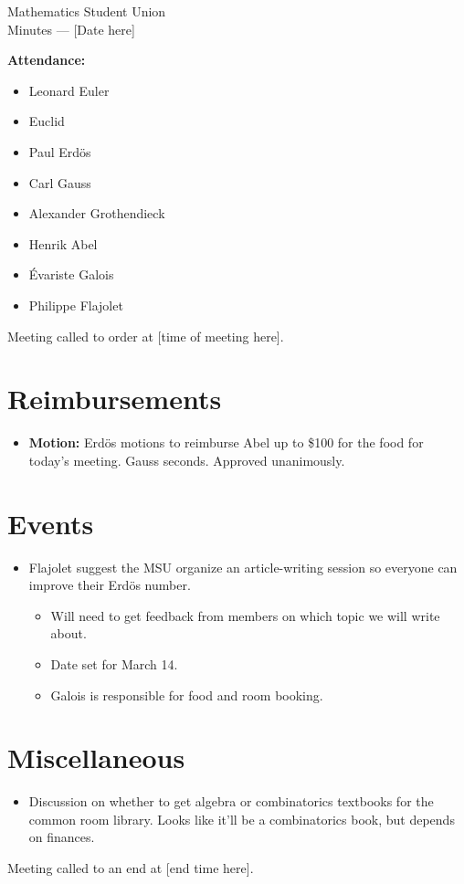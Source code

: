 \documentclass{article}
\begin{document}
\begin{center}
  {\Large Mathematics Student Union \\[1em] Minutes --- [Date here]}
\end{center}
\vspace{0.5cm}

\noindent
\textbf{Attendance:}
\begin{multicols}{2}
  \begin{itemize}
  \item Leonard Euler
  \item Euclid
  \item Paul Erd{\"o}s
  \item Carl Gauss
  \item Alexander Grothendieck
  \item Henrik Abel
  \item {\'E}variste Galois
  \item Philippe Flajolet
  \end{itemize}
\end{multicols}
\vspace{0.5cm}

\noindent
Meeting called to order at [time of meeting here].


\section{Reimbursements}

\begin{itemize}
\item
  \textbf{Motion:} Erd{\"o}s motions to reimburse Abel up to \$100 for the food for today's meeting. Gauss seconds. Approved unanimously.
\end{itemize}


\section{Events}

\begin{itemize}
\item
  Flajolet suggest the MSU organize an article-writing session so everyone can improve their Erd{\"os} number.
  \begin{itemize}
  \item
    Will need to get feedback from members on which topic we will write about.
  \item
    Date set for March 14.
  \item
    Galois is responsible for food and room booking.
  \end{itemize}
\end{itemize}


\section{Miscellaneous}

\begin{itemize}
\item
  Discussion on whether to get algebra or combinatorics textbooks for the common room library. Looks like it'll be a combinatorics book, but depends on finances.
\end{itemize}


\vspace{0.5cm}
\noindent
Meeting called to an end at [end time here].
\end{document}
